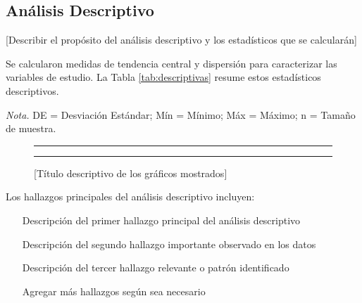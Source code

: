 \documentclass[12pt, letterpaper]{article}
\begin{document}
\subsection{Análisis Descriptivo}

[Describir el propósito del análisis descriptivo y los estadísticos que se calcularán]

Se calcularon medidas de tendencia central y dispersión para caracterizar las variables de estudio. La Tabla \ref{tab:descriptivas} resume estos estadísticos descriptivos.

\begin{table}[H]
    \centering
    \caption{Estadísticas Descriptivas de las Variables de Estudio}
    \label{tab:descriptivas}

    \vspace{0.2cm}
    \textit{Nota.} DE = Desviación Estándar; Mín = Mínimo; Máx = Máximo; n = Tamaño de muestra.
\end{table}

\begin{figure}[H]
    \centering
    \rule{5cm}{3cm} %
    \hfill
    \rule{5cm}{3cm} %
    \caption{[Título descriptivo de los gráficos mostrados]}
    \label{fig:[etiqueta_descriptiva]}
\end{figure}

Los hallazgos principales del análisis descriptivo incluyen:

\begin{itemize}
    \item [Descripción del primer hallazgo principal del análisis descriptivo]
    \item [Descripción del segundo hallazgo importante observado en los datos]
    \item [Descripción del tercer hallazgo relevante o patrón identificado]
    \item [Agregar más hallazgos según sea necesario]
\end{itemize}
\end{document}
